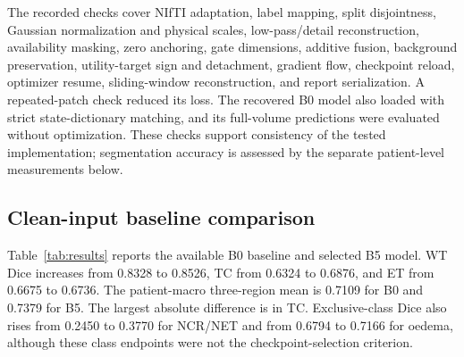 \documentclass[conference]{IEEEtran}
\begin{document}
The recorded checks cover NIfTI adaptation, label mapping, split disjointness, Gaussian normalization and physical scales, low-pass/detail reconstruction, availability masking, zero anchoring, gate dimensions, additive fusion, background preservation, utility-target sign and detachment, gradient flow, checkpoint reload, optimizer resume, sliding-window reconstruction, and report serialization. A repeated-patch check reduced its loss. The recovered B0 model also loaded with strict state-dictionary matching, and its full-volume predictions were evaluated without optimization. These checks support consistency of the tested implementation; segmentation accuracy is assessed by the separate patient-level measurements below.

\subsection{Clean-input baseline comparison}
Table~\ref{tab:results} reports the available B0 baseline and selected B5 model. WT Dice increases from 0.8328 to 0.8526, TC from 0.6324 to 0.6876, and ET from 0.6675 to 0.6736. The patient-macro three-region mean is 0.7109 for B0 and 0.7379 for B5. The largest absolute difference is in TC. Exclusive-class Dice also rises from 0.2450 to 0.3770 for NCR/NET and from 0.6794 to 0.7166 for oedema, although these class endpoints were not the checkpoint-selection criterion.
\end{document}
